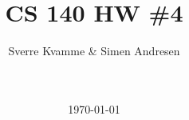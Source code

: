 



\title{CS 140 HW \#4}
\author{Sverre Kvamme \& Simen Andresen}
\date{\ \\ \ \\ \today}




\maketitle



\setcounter{page}{1}



%



